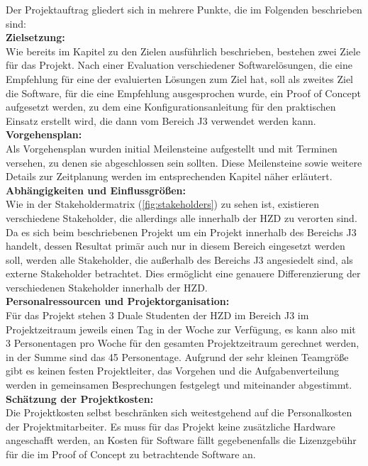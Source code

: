 \documentclass[ThesisDJ.tex]{subfiles}
\begin{document}
	Der Projektauftrag gliedert sich in mehrere Punkte, die im Folgenden beschrieben sind:\bigskip\\
	\textbf{Zielsetzung:}\medskip\\
	Wie bereits im Kapitel zu den Zielen ausführlich beschrieben, bestehen zwei Ziele für das Projekt. Nach einer Evaluation verschiedener Softwarelösungen, die eine Empfehlung für eine der evaluierten Lösungen zum Ziel hat, soll als zweites Ziel die Software, für die eine Empfehlung ausgesprochen wurde, ein Proof of Concept aufgesetzt werden, zu dem eine Konfigurationsanleitung für den praktischen Einsatz erstellt wird, die dann vom Bereich J3 verwendet werden kann.\bigskip\\
	\textbf{Vorgehensplan:}\medskip\\
	Als Vorgehensplan wurden initial Meilensteine aufgestellt und mit Terminen versehen, zu denen sie abgeschlossen sein sollten. Diese Meilensteine sowie weitere Details zur Zeitplanung werden im entsprechenden Kapitel näher erläutert.\bigskip\\
	\textbf{Abhängigkeiten und Einflussgrößen:}	\medskip\\
	Wie in der Stakeholdermatrix (\ref{fig:stakeholders}) zu sehen ist, existieren verschiedene Stakeholder, die allerdings alle innerhalb der HZD zu verorten sind. Da es sich beim beschriebenen Projekt um ein Projekt innerhalb des Bereichs J3 handelt, dessen Resultat primär auch nur in diesem Bereich eingesetzt werden soll, werden alle Stakeholder, die außerhalb des Bereichs J3 angesiedelt sind, als externe Stakeholder betrachtet. Dies ermöglicht eine genauere Differenzierung der verschiedenen Stakeholder innerhalb der HZD.\bigskip\\
	\textbf{Personalressourcen und Projektorganisation:}\medskip\\
	Für das Projekt stehen 3 Duale Studenten der HZD im Bereich J3 im Projektzeitraum jeweils einen Tag in der Woche zur Verfügung, es kann also mit 3 Personentagen pro Woche für den gesamten Projektzeitraum gerechnet werden, in der Summe sind das 45 Personentage.
	Aufgrund der sehr kleinen Teamgröße gibt es keinen festen Projektleiter, das Vorgehen und die Aufgabenverteilung werden in gemeinsamen Besprechungen festgelegt und miteinander abgestimmt.\bigskip\\
	\textbf{Schätzung der Projektkosten:}\medskip\\
	Die Projektkosten selbst beschränken sich weitestgehend auf die Personalkosten der Projektmitarbeiter.
	Es muss für das Projekt keine zusätzliche Hardware angeschafft werden, an Kosten für Software fällt gegebenenfalls die Lizenzgebühr für die im Proof of Concept zu betrachtende Software an.\bigskip\\
\end{document}
